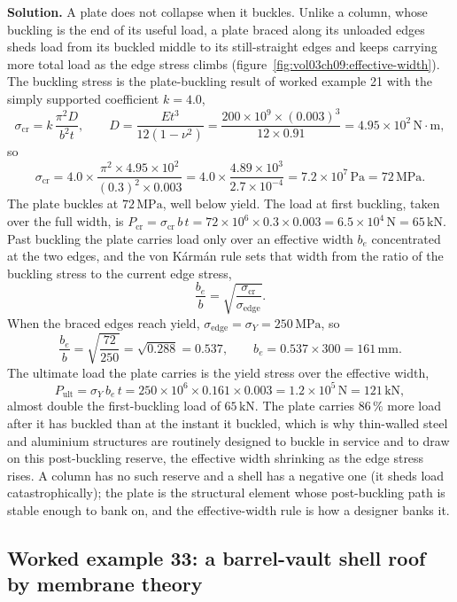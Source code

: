 \textbf{Solution.} A plate does not collapse when it buckles. Unlike a
column, whose buckling is the end of its useful load, a plate braced along
its unloaded edges sheds load from its buckled middle to its still-straight
edges and keeps carrying more total load as the edge stress climbs
(figure~\ref{fig:vol03ch09:effective-width}). The buckling stress is the
plate-buckling result of worked example 21 with the simply supported
coefficient $k = 4.0$,
\[
\sigma_{\text{cr}} = k\,\frac{\pi^2 D}{b^2 t},
\qquad D = \frac{E t^3}{12(1-\nu^2)} = \frac{200\times 10^9\times (0.003)^3}
{12\times 0.91} = 4.95\times 10^2\,\text{N}\cdot\text{m},
\]
so
\[
\sigma_{\text{cr}} = 4.0\times \frac{\pi^2\times 4.95\times 10^2}
{(0.3)^2\times 0.003}
= 4.0\times \frac{4.89\times 10^3}{2.7\times 10^{-4}}
= 7.2\times 10^{7}\,\text{Pa} = 72\,\text{MPa}.
\]
The plate buckles at $72\,\text{MPa}$, well below yield. The load at first
buckling, taken over the full width, is $P_{\text{cr}} = \sigma_{\text{cr}}\,
b\,t = 72\times 10^6\times 0.3\times 0.003 = 6.5\times 10^4\,\text{N} =
65\,\text{kN}$. Past buckling the plate carries load only over an effective
width $b_e$ concentrated at the two edges, and the von K\'arm\'an rule sets
that width from the ratio of the buckling stress to the current edge stress,
\[
\frac{b_e}{b} = \sqrt{\frac{\sigma_{\text{cr}}}{\sigma_{\text{edge}}}}.
\]
When the braced edges reach yield, $\sigma_{\text{edge}} = \sigma_Y =
250\,\text{MPa}$, so
\[
\frac{b_e}{b} = \sqrt{\frac{72}{250}} = \sqrt{0.288} = 0.537,
\qquad b_e = 0.537\times 300 = 161\,\si{\milli\meter}.
\]
The ultimate load the plate carries is the yield stress over the effective
width,
\[
P_{\text{ult}} = \sigma_Y\,b_e\,t
= 250\times 10^6\times 0.161\times 0.003 = 1.2\times 10^{5}\,\text{N}
= 121\,\text{kN},
\]
almost double the first-buckling load of $65\,\text{kN}$. The plate carries
$86\,\%$ more load after it has buckled than at the instant it buckled, which
is why thin-walled steel and aluminium structures are routinely designed to
buckle in service and to draw on this post-buckling reserve, the effective
width shrinking as the edge stress rises. A column has no such reserve and a
shell has a negative one (it sheds load catastrophically); the plate is the
structural element whose post-buckling path is stable enough to bank on, and
the effective-width rule is how a designer banks it.

\subsection*{Worked example 33: a barrel-vault shell roof by membrane theory}

